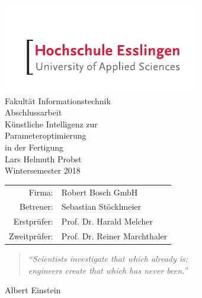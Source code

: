 





\begin{titlepage}
    \begin{center}
        \includegraphics[scale=2.5]{images/he_logo.pdf}\\
        \vspace{1cm} Fakultät Informationstechnik\\
        \vspace{1.5cm} \Large Abschlussarbeit\\
        \vspace{1.5cm} \Huge Künstliche Intelligenz zur \\ Parameteroptimierung \\ in der Fertigung\\
        \vspace{1.5cm} \Large Lars Helmuth Probst\\\normalsize
        \vspace{0.5cm} Wintersemester 2018\\\normalsize
        \vfill{}
        \begin{tabular}{rl}
            Firma: & Robert Bosch GmbH\\[0.5cm]
            Betreuer: & Sebastian Stöcklmeier\\[0.5cm]
            Erstprüfer: & Prof. Dr. Harald Melcher\\[0.5cm]
            Zweitprüfer: & Prof. Dr. Reiner Marchthaler
        \end{tabular}
    \end{center}
\end{titlepage}

\thispagestyle{empty}
\vspace*{2cm}
\begin{center}
    \begin{minipage}{12cm}
        \begin{center}
        \end{center}
    \end{minipage}

    \vfill{}

    \begin{minipage}{10cm}
        \begin{quote}
            \textit{\enquote{Scientists investigate that which already is;\\ engineers create that which has never been.}}
        \end{quote}
        \hfill Albert Einstein
    \end{minipage}
\end{center}

